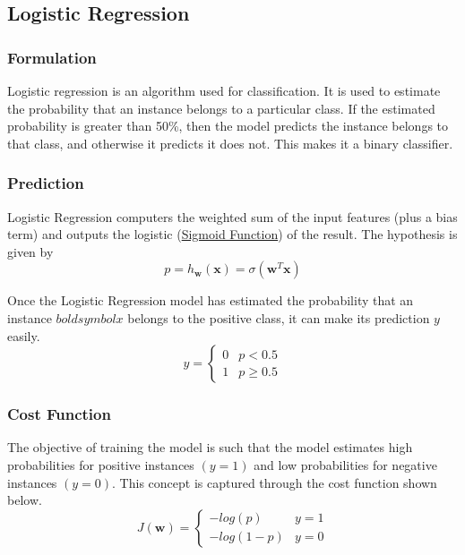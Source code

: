 \documentclass[12pt]{article}
\begin{document}
    \subsection{Logistic Regression}
        \subsubsection{Formulation}
            Logistic regression is an algorithm used for classification. It is used to estimate the probability that an instance belongs to a particular class. If the estimated probability is
            greater than 50\%, then the model predicts the instance belongs to that class, and otherwise it predicts it does not. This makes it a binary classifier.

        \subsubsection{Prediction}
            Logistic Regression computers the weighted sum of the input features (plus a bias term) and outputs the logistic (\hyperlink{sigmoid function}{Sigmoid Function}) of the result. The hypothesis is given by
            $$ p = h_{\boldsymbol{w}}(\boldsymbol{x}) = \sigma(\boldsymbol{w}^T\boldsymbol{x}) $$
            
            Once the Logistic Regression model has estimated the probability that an instance $boldsymbol{x}$ belongs to the positive class, it can make its prediction $y$ easily.
            \[ y = 
                \begin{cases} 
                    0 & p < 0.5 \\
                    1 & p\geq 0.5 
                \end{cases}
            \]
        
        \subsubsection{Cost Function}
            The objective of training the model is such that the model estimates high probabilities for positive instances $(y = 1)$ and low probabilities for negative instances $(y = 0)$.
            This concept is captured through the cost function shown below.
            \[ J(\boldsymbol{w}) = 
                \begin{cases}
                    -log(p) & y = 1 \\
                    -log(1-p) & y = 0
                \end{cases}
            \]
            
\end{document}
